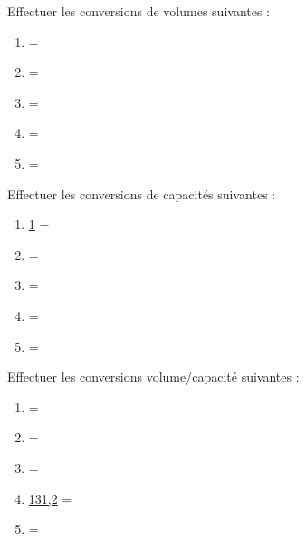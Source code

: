 \begin{colonne*exercice}


\begin{exercice}
   Effectuer les conversions de volumes suivantes : \medskip
   \begin{enumerate}
      \item {} = \pfb \ummc{} \medskip
      \item {} = \pfb \ucmc{} \medskip
      \item {} = \pfb \udamc{} \medskip
      \item {} = \pfb \ummc{} \medskip
      \item {} = \pfb \ukmc{} \medskip
   \end{enumerate}
\end{exercice}

\begin{exercice}
   Effectuer les conversions de capacités suivantes : \medskip
   \begin{enumerate}
      \item \ul{1} = \pfb \udl{} \medskip
      \item {} = \pfb \ucl{} \medskip
      \item {} = \pfb \ul{} \medskip
      \item {} = \pfb \udal{} \medskip
      \item {} = \pfb \udl{} \medskip
   \end{enumerate}
\end{exercice}

\begin{exercice}
   Effectuer les conversions volume/capacité suivantes : \medskip
   \begin{enumerate}
      \item {} = \pfb \ul{} \medskip
      \item {} = \pfb \ul{} \medskip
      \item {} = \pfb \ucmc{} \medskip
      \item \ul{131,2} = \pfb \umc{} \medskip
      \item {} = \pfb \udl{} \medskip
   \end{enumerate}
\end{exercice}


\end{colonne*exercice}
